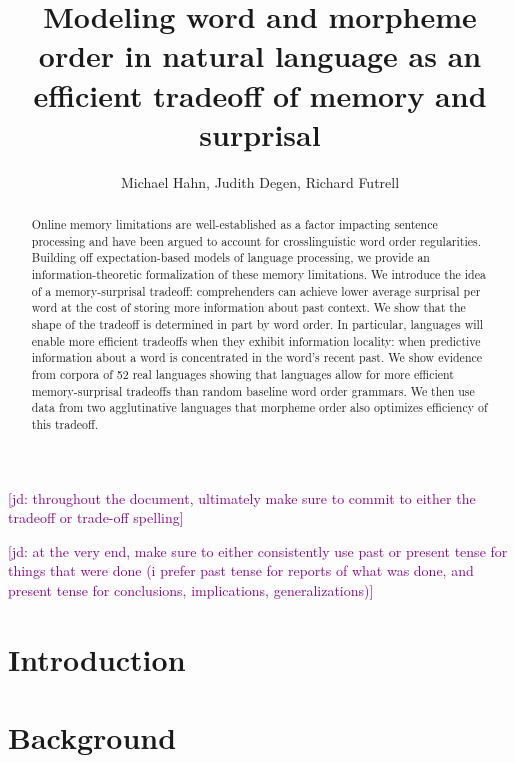 \documentclass[11pt,letterpaper]{article}
\title{Modeling word and morpheme order in natural language as an efficient tradeoff of memory and surprisal}
\author{Michael Hahn, Judith Degen, Richard Futrell}
\newcommand{\jd}[1]{\textcolor{Purple}{[jd: #1]}}
\begin{document}
\maketitle


\begin{abstract}
Online memory limitations are well-established as a factor impacting sentence processing and have been argued to account for crosslinguistic word order regularities. Building off expectation-based models of language processing, we provide an information-theoretic formalization of these memory limitations. We introduce the idea of a memory-surprisal tradeoff: comprehenders can achieve lower average surprisal per word at the cost of storing more information about past context. We show that the shape of the tradeoff is determined in part by word order. In particular, languages will enable more efficient tradeoffs when they exhibit information locality: when predictive information about a word is concentrated in the word’s recent past. We show evidence from corpora of 52 real languages showing that languages allow for more efficient memory-surprisal tradeoffs than random baseline word order grammars. 
We then use data from two agglutinative languages that morpheme order also optimizes efficiency of this tradeoff.
\end{abstract}


% 

 \jd{throughout the document, ultimately make sure to commit to either the tradeoff or trade-off spelling}
 
 \jd{at the very end, make sure to either consistently use past or present tense for things that were done (i prefer past tense for reports of what was done, and present tense for conclusions, implications, generalizations)}
 
\section{Introduction}





\section{Background}\label{sec:background}
\end{document}
